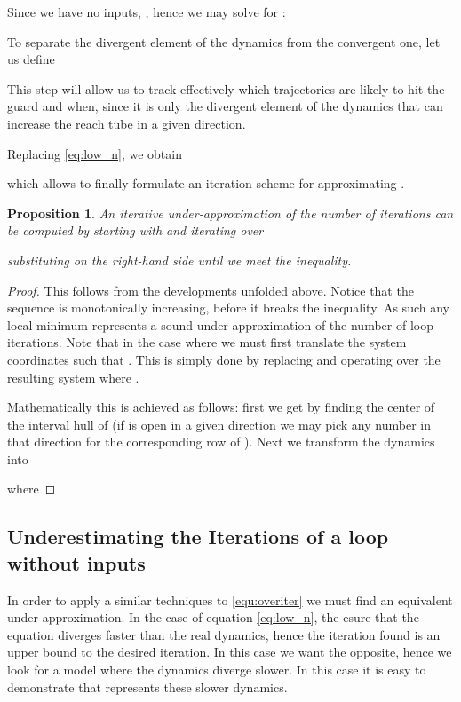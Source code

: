 \documentclass{IEEEtran}
\newtheorem{proposition}{Proposition}
\begin{document}
Since we have no inputs, , hence we may solve for :


To separate the divergent element of the dynamics from the
convergent one, let us define

This step will allow us to track effectively which trajectories are
likely to hit the guard and when, since it is only the divergent
element of the dynamics that can increase the reach tube in a given
direction.

Replacing \eqref{eq:low_n}, we obtain

which allows to finally formulate an iteration scheme for approximating .

\begin{proposition}\label{prop:real_under_n}
  An iterative under-approximation of the number of iterations  can
  be computed by starting with  and iterating over

substituting  on the right-hand side until we meet the inequality. 
\end{proposition}
\begin{proof}
This follows from the developments unfolded above. 
Notice that the sequence  is monotonically increasing, before it breaks the inequality. 
As such any local minimum represents a sound under-approximation of the number of loop iterations. 
Note that in the case where  we must first translate the system coordinates such that . 
This is simply done by replacing  and operating over the resulting system where  .

Mathematically this is achieved as follows: first we get  by finding the center of the interval hull of  (if  is open in a given direction we may pick any number in that direction for the corresponding row of ). Next we transform the dynamics into

where 

\end{proof}

\subsection{Underestimating the Iterations of a loop without inputs} \label{sec:guards_under}
In order to apply a similar techniques to \eqref{equ:overiter} we must find an equivalent under-approximation. In the case of equation \eqref{eq:low_n}, the  esure that the equation diverges faster than the real dynamics, hence the iteration found is an upper bound to the desired iteration. In this case we want the opposite, hence we look for a model where the dynamics diverge slower. In this case it is easy to demonstrate that  represents these slower dynamics.
\end{document}
